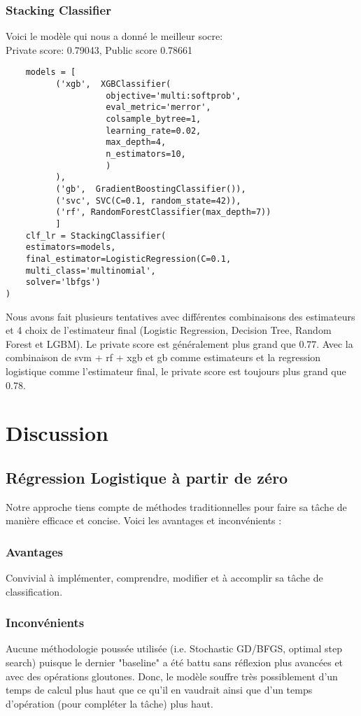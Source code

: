 \documentclass{article}
\begin{document}
\subsubsection{Stacking Classifier}
Voici le modèle qui nous a donné le meilleur socre: \\
Private score: 0.79043, 
Public score 0.78661 
\begin{verbatim}
    models = [
          ('xgb',  XGBClassifier(
                    objective='multi:softprob', 
                    eval_metric='merror', 
                    colsample_bytree=1, 
                    learning_rate=0.02, 
                    max_depth=4, 
                    n_estimators=10,
                    )
          ),
          ('gb',  GradientBoostingClassifier()),
          ('svc', SVC(C=0.1, random_state=42)),
          ('rf', RandomForestClassifier(max_depth=7))
          ]
    clf_lr = StackingClassifier(
    estimators=models, 
    final_estimator=LogisticRegression(C=0.1,
    multi_class='multinomial', 
    solver='lbfgs')
)
\end{verbatim}

Nous avons fait plusieurs tentatives avec différentes combinaisons des 
estimateurs et 4 choix de l'estimateur final (Logistic Regression, Decision 
Tree, Random Forest et LGBM). Le private score est généralement plus grand que 
0.77. Avec la combinaison de svm + rf + xgb et gb comme estimateurs et la 
regression logistique comme l'estimateur final, le private score est toujours 
plus grand que 0.78.

\section{Discussion}
\subsection{Régression Logistique à partir de zéro}
Notre approche tiens compte de méthodes traditionnelles pour faire sa tâche de 
manière efficace et concise. Voici les avantages et inconvénients :
\subsubsection{Avantages}
Convivial à implémenter, comprendre, modifier et à accomplir sa tâche de 
classification.

\subsubsection{Inconvénients}
Aucune méthodologie poussée utilisée (i.e. Stochastic GD/BFGS, optimal step 
search) puisque le dernier "baseline" a été battu sans réflexion plus avancées 
et avec des opérations gloutones. Donc, le modèle souffre très possiblement d'un
 temps de calcul plus haut que ce qu'il en vaudrait ainsi que d'un temps 
 d'opération (pour compléter la tâche) plus haut.
\end{document}
